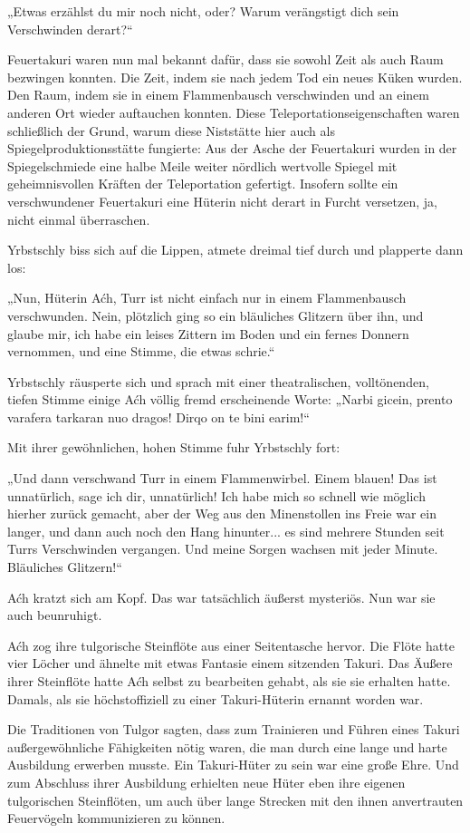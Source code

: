 „Etwas erzählst du mir noch nicht, oder? Warum verängstigt dich sein Verschwinden derart?“

Feuertakuri waren nun mal bekannt dafür, dass sie sowohl Zeit als auch Raum bezwingen konnten. Die Zeit, indem sie nach jedem Tod ein neues Küken wurden. Den Raum, indem sie in einem Flammenbausch verschwinden und an einem anderen Ort wieder auftauchen konnten. Diese Teleportationseigenschaften waren schließlich der Grund, warum diese Niststätte hier auch als Spiegelproduktionsstätte fungierte: Aus der Asche der Feuertakuri wurden in der Spiegelschmiede eine halbe Meile weiter nördlich wertvolle Spiegel mit geheimnisvollen Kräften der Teleportation gefertigt. Insofern sollte ein verschwundener Feuertakuri eine Hüterin nicht derart in Furcht versetzen, ja, nicht einmal überraschen.

Yrbstschly biss sich auf die Lippen, atmete dreimal tief durch und plapperte dann los:

„Nun, Hüterin Aćh, Turr ist nicht einfach nur in einem Flammenbausch verschwunden. Nein, plötzlich ging so ein bläuliches Glitzern über ihn, und glaube mir, ich habe ein leises Zittern im Boden und ein fernes Donnern vernommen, und eine Stimme, die etwas schrie.“

Yrbstschly räusperte sich und sprach mit einer theatralischen, volltönenden, tiefen Stimme einige Aćh völlig fremd erscheinende Worte: „Narbi gicein, prento varafera tarkaran nuo dragos! Dirqo on te bini earim!“

Mit ihrer gewöhnlichen, hohen Stimme fuhr Yrbstschly fort:

„Und dann verschwand Turr in einem Flammenwirbel. Einem blauen! Das ist unnatürlich, sage ich dir, unnatürlich! Ich habe mich so schnell wie möglich hierher zurück gemacht, aber der Weg aus den Minenstollen ins Freie war ein langer, und dann auch noch den Hang hinunter... es sind mehrere Stunden seit Turrs Verschwinden vergangen. Und meine Sorgen wachsen mit jeder Minute. Bläuliches Glitzern!“

Aćh kratzt sich am Kopf. Das war tatsächlich äußerst mysteriös. Nun war sie auch beunruhigt.

Aćh zog ihre tulgorische Steinflöte aus einer Seitentasche hervor. Die Flöte hatte vier Löcher und ähnelte mit etwas Fantasie einem sitzenden Takuri. Das Äußere ihrer Steinflöte hatte Aćh selbst zu bearbeiten gehabt, als sie sie erhalten hatte. Damals, als sie höchstoffiziell zu einer Takuri-Hüterin ernannt worden war.

Die Traditionen von Tulgor sagten, dass zum Trainieren und Führen eines Takuri außergewöhnliche Fähigkeiten nötig waren, die man durch eine lange und harte Ausbildung erwerben musste. Ein Takuri-Hüter zu sein war eine große Ehre. Und zum Abschluss ihrer Ausbildung erhielten neue Hüter eben ihre eigenen tulgorischen Steinflöten, um auch über lange Strecken mit den ihnen anvertrauten Feuervögeln kommunizieren zu können.

